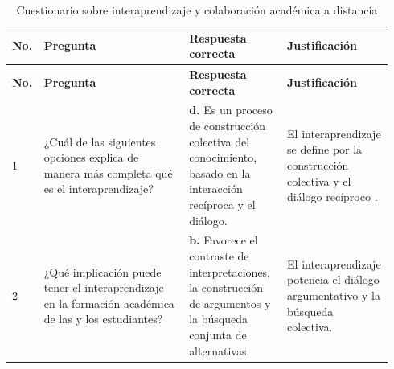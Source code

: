 \documentclass[
  spanish,
  letterpaper, oneside
]{article}
\begin{document}
\clearpage
\pagestyle{empty}
\begin{landscape}
\thispagestyle{empty}
\begingroup
\fontsize{7.25}{8.1}\selectfont
\setlength{\tabcolsep}{2.8pt}
\renewcommand{\arraystretch}{1.12}
\begin{longtable}{@{}>{\centering\arraybackslash}p{0.045\linewidth}>{\raggedright\arraybackslash}p{0.37\linewidth}>{\raggedright\arraybackslash}p{0.25\linewidth}>{\raggedright\arraybackslash}p{0.27\linewidth}@{}}
\caption{Cuestionario sobre interaprendizaje y colaboración académica a distancia}\label{tab:cuestionario-interaprendizaje-a3}\\
\toprule
\textbf{No.} & \textbf{Pregunta} & \textbf{Respuesta correcta} & \textbf{Justificación} \\
\midrule
\endfirsthead
\toprule
\textbf{No.} & \textbf{Pregunta} & \textbf{Respuesta correcta} & \textbf{Justificación} \\
\midrule
\endhead
\bottomrule
\endfoot
\bottomrule
\endlastfoot
1 & ¿Cuál de las siguientes opciones explica de manera más completa qué es el interaprendizaje? & \textbf{d.} Es un proceso de construcción colectiva del conocimiento, basado en la interacción recíproca y el diálogo. & El interaprendizaje se define por la construcción colectiva y el diálogo recíproco \citep{bertely2011interaprendizajes}. \\
\midrule
2 & ¿Qué implicación puede tener el interaprendizaje en la formación académica de las y los estudiantes? & \textbf{b.} Favorece el contraste de interpretaciones, la construcción de argumentos y la búsqueda conjunta de alternativas. & El interaprendizaje potencia el diálogo argumentativo y la búsqueda colectiva. \\

\end{longtable}
\end{landscape}
\end{document}
